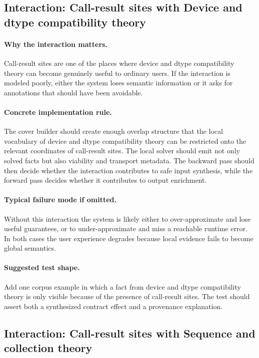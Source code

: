 \documentclass[11pt]{report}
\theoremstyle{definition}
\theoremstyle{plain}
\begin{document}
\subsection{Interaction: Call-result sites with Device and dtype compatibility theory}

\paragraph{Why the interaction matters.}
Call-result sites are one of the places where device and dtype compatibility theory can become
genuinely useful to ordinary users. If the interaction is modeled poorly,
either the system loses semantic information or it asks for annotations that
should have been avoidable.

\paragraph{Concrete implementation rule.}
The cover builder should create enough overlap structure that the local
vocabulary of device and dtype compatibility theory can be restricted onto the relevant
coordinates of call-result sites. The local solver should emit not only
solved facts but also viability and transport metadata. The backward pass
should then decide whether the interaction contributes to safe input
synthesis, while the forward pass decides whether it contributes to output
enrichment.

\paragraph{Typical failure mode if omitted.}
Without this interaction the system is likely either to over-approximate and
lose useful guarantees, or to under-approximate and miss a reachable runtime
error. In both cases the user experience degrades because local evidence
fails to become global semantics.

\paragraph{Suggested test shape.}
Add one corpus example in which a fact from device and dtype compatibility theory is only
visible because of the presence of call-result sites. The test should
assert both a synthesized contract effect and a provenance explanation.

\subsection{Interaction: Call-result sites with Sequence and collection theory}
\end{document}
